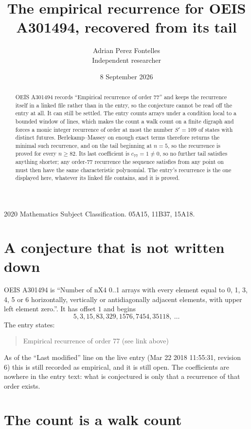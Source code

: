 \documentclass[11pt,a4paper]{article}
\title{The empirical recurrence for OEIS A301494, recovered from its tail}
\author{Adrian Perez Fontelles\\ \small Independent researcher}
\date{8 September 2026}
\theoremstyle{plain}
\theoremstyle{definition}
\begin{document}
\maketitle

\begin{abstract}
OEIS A301494 records ``Empirical recurrence of order $77$'' and keeps the recurrence itself in
a linked file rather than in the entry, so the conjecture cannot be read off the entry at all.
It can still be settled. The entry counts arrays under a condition local to a bounded window of
lines, which makes the count a walk count on a finite digraph and forces a monic integer
recurrence of order at most the number $S'=109$ of states with distinct futures. Berlekamp--Massey on
enough exact terms therefore returns the minimal such recurrence, and on the tail beginning at $n=5$, so the recurrence is proved for every $n\ge82$.
Its last coefficient is $c_{77}=1\neq0$, so no further tail satisfies anything
shorter; any order-$77$ recurrence the sequence satisfies from any point on must then have
the same characteristic polynomial. The entry's recurrence is the one displayed here, whatever
its linked file contains, and it is proved.
\end{abstract}

\noindent\small 2020 Mathematics Subject Classification. 05A15, 11B37, 15A18.\normalsize

\section{A conjecture that is not written down}

OEIS A301494 is ``Number of nX4 0..1 arrays with every element equal to 0, 1, 3, 4, 5 or 6 horizontally, vertically or antidiagonally adjacent elements, with upper left element zero.''. It has offset $1$ and begins
\[
5, 3, 15, 83, 329, 1576, 7454, 35118,\ \dots
\]
The entry states:
\begin{quote}
Empirical recurrence of order 77 (see link above)
\end{quote}
As of the ``Last modified'' line on the live entry (Mar 22 2018 11:55:31, revision 6)
this is still recorded as empirical, and it is still open. The coefficients are nowhere in the
entry text: what is conjectured is only that a recurrence of that order exists.

\section{The count is a walk count}
\end{document}
